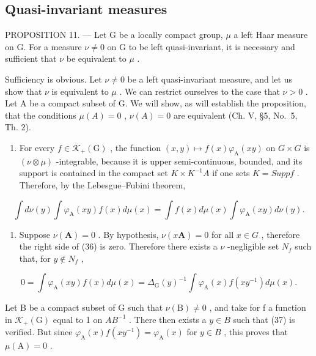 \subsection{Quasi-invariant measures}

PROPOSITION 11. --- Let G be a locally compact group, \(\mu\) a left Haar measure on G. For a measure \(\nu \neq 0\) on G to be left quasi-invariant, it is necessary and sufficient that \(\nu\) be equivalent to \(\mu\) .

Sufficiency is obvious. Let \(\nu \neq 0\) be a left quasi-invariant measure, and let us show that \(\nu\) is equivalent to \(\mu\) . We can restrict ourselves to the case that \(\nu > 0\) . Let A be a compact subset of G. We will show, as will establish the proposition, that the conditions \(\mu(A) = 0\) , \(\nu(A) = 0\) are equivalent (Ch. V, §5, No.~5, Th. 2).

\begin{enumerate}
\def\labelenumi{\alph{enumi})}
\tightlist
\item
  For every \(f \in \mathcal{K}_{+}(\mathrm{G})\) , the function \((x, y) \mapsto f(x)\varphi_{\mathrm{A}}(xy)\) on \(G \times G\) is \((\nu \otimes \mu)\) -integrable, because it is upper semi-continuous, bounded, and its support is contained in the compact set \(K \times K^{-1}A\) if one sets \(K = Supp f\) . Therefore, by the Lebesgue--Fubini theorem,
\end{enumerate}

\[
\int d \nu (y) \int \varphi_ {\mathrm{A}} (x y) f (x) d \mu (x) = \int f (x) d \mu (x) \int \varphi_ {\mathrm{A}} (x y) d \nu (y).\tag{36}
\]

\begin{enumerate}
\def\labelenumi{\alph{enumi})}
\setcounter{enumi}{1}
\tightlist
\item
  Suppose \(\nu(\mathbf{A}) = 0\) . By hypothesis, \(\nu(x\mathbf{A}) = 0\) for all \(x \in G\) , therefore the right side of (36) is zero. Therefore there exists a \(\nu\) -negligible set \(N_{f}\) such that, for \(y \notin N_{f}\) ,
\end{enumerate}

\[
0 = \int \varphi_ {\mathrm{A}} (x y) f (x) d \mu (x) = \Delta_ {\mathrm{G}} (y) ^ {- 1} \int \varphi_ {\mathrm{A}} (x) f (x y ^ {- 1}) d \mu (x).\tag{37}
\]

Let B be a compact subset of G such that \(\nu(\mathrm{B})\neq0\) , and take for f a function in \(\mathcal{K}_{+}(\mathrm{G})\) equal to 1 on \(AB^{-1}\) . There then exists a \(y\in B\) such that (37) is verified. But since \(\varphi_{\mathrm{A}}(x)f(xy^{-1})=\varphi_{\mathrm{A}}(x)\) for \(y\in B\) , this proves that \(\mu(\mathrm{A})=0\) .

